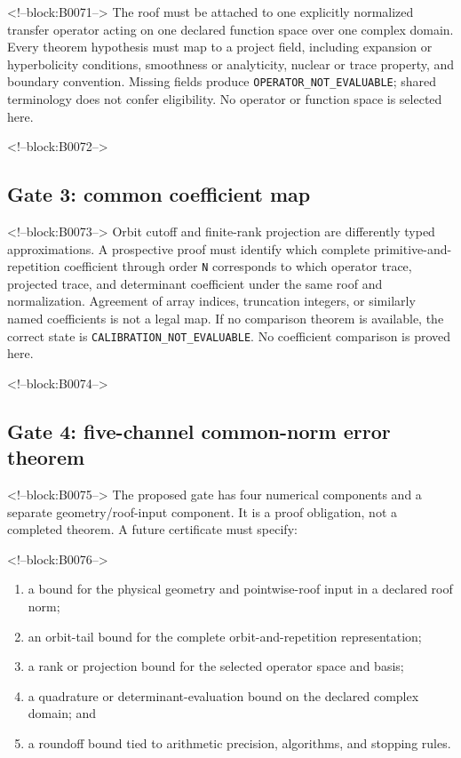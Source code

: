 \documentclass[11pt,a4paper]{article}
\providecommand{\tightlist}{\setlength{\itemsep}{0pt}\setlength{\parskip}{0pt}}
\begin{document}
<!--block:B0071-->
The roof must be attached to one explicitly normalized transfer operator acting on one declared function space over one complex domain. Every theorem hypothesis must map to a project field, including expansion or hyperbolicity conditions, smoothness or analyticity, nuclear or trace property, and boundary convention. Missing fields produce \texttt{OPERATOR\_NOT\_EVALUABLE}; shared terminology does not confer eligibility. No operator or function space is selected here.

<!--block:B0072-->
\subsection{Gate 3: common coefficient map}

<!--block:B0073-->
Orbit cutoff and finite-rank projection are differently typed approximations. A prospective proof must identify which complete primitive-and-repetition coefficient through order \texttt{N} corresponds to which operator trace, projected trace, and determinant coefficient under the same roof and normalization. Agreement of array indices, truncation integers, or similarly named coefficients is not a legal map. If no comparison theorem is available, the correct state is \texttt{CALIBRATION\_NOT\_EVALUABLE}. No coefficient comparison is proved here.

<!--block:B0074-->
\subsection{Gate 4: five-channel common-norm error theorem}

<!--block:B0075-->
The proposed gate has four numerical components and a separate geometry/roof-input component. It is a proof obligation, not a completed theorem. A future certificate must specify:

<!--block:B0076-->
\begin{enumerate}
\def\labelenumi{\arabic{enumi}.}
\tightlist
\item
  a bound for the physical geometry and pointwise-roof input in a declared roof norm;
\item
  an orbit-tail bound for the complete orbit-and-repetition representation;
\item
  a rank or projection bound for the selected operator space and basis;
\item
  a quadrature or determinant-evaluation bound on the declared complex domain; and
\item
  a roundoff bound tied to arithmetic precision, algorithms, and stopping rules.
\end{enumerate}
\end{document}
